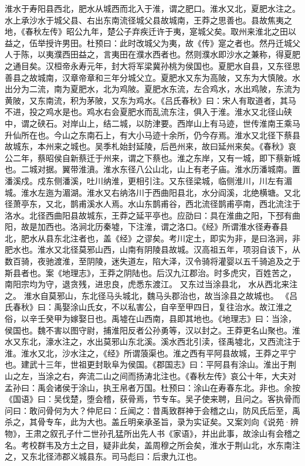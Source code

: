 \documentclass[12pt,UTF8]{ctexbook}
\begin{document}
淮水于寿阳县西北，肥水从城西而北入于淮，谓之肥口。淮水又北，夏肥水注之。水上承沙水于城父县、右出东南流径城父县故城南，王莽之思善也。县故焦夷之地，《春秋左传》昭公九年，楚公子弃疾迁许于夷，寔城父矣。取州来淮北之田以益之，伍举授许男田。杜预曰：此时改城父为夷，故《传》寔之者也。然丹迁城父人于陈，以夷濮西田益之，言夷田在濮水西者也。然则濮水即沙水之兼称，得夏肥之通目矣。汉桓帝永寿元年，封大将军梁冀孙桃为侯国也。夏肥水自县，又东径思善县之故城南，汉章帝章和三年分城父立。夏肥水又东为高陂，又东为大慎陂。水出分为二流，南为夏肥水，北为鸡陂。夏肥水东流，左合鸡水，水出鸡陂，东流为黄陂，又东南流，积为茅陂，又东为鸡水。《吕氏春秋》曰：宋人有取道者，其马不进，投之鸡水是也。鸡水右会夏肥水而乱流东注，俱入于淮。淮水又北径山硖中，谓之硖石。对岸山上，结二城，以防津要。西岸山上有马迹，世传淮南王乘马升仙所在也。今山之东南石上，有大小马迹十余所，仍今存焉。淮水又北径下蔡县故城东，本州来之城也。吴季札始封延陵，后邑州来，故曰延州来矣。《春秋》哀公二年，蔡昭侯自新蔡迁于州来，谓之下蔡也。淮之东岸，又有一城，即下蔡新城也。二城对据。翼带淮濆。淮水东径八公山北，山上有老子庙。淮水历潘城南。置潘溪戍。戍东侧潘溪，吐川纳淮，更相引注。又东径梁城，临侧淮川，川左有湄城。淮水左迤为湄湖。淮水又右纳洛川于西曲阳县北，水分阎溪，北绝横塘。又北径萧亭东，又北，鹊甫溪水人焉。水山东鹊甫谷，西北流径鹊甫亭南，西北流注于洛水。北径西曲阳县故城东，王莽之延平亭也。应劭曰：具在淮曲之阳，下邳有曲阳，故是加西也。洛涧北历秦墟，下注淮，谓之洛口。《经》所谓淮水径寿春县北，肥水从县东北注者也，盖《经》之谬矣。考川定土，即实为非，是曰洛涧，非肥水也。淮水又北径莫邪山西，山南有阴陵县故城。汉高祖五年，项羽自该下，从数百骑，夜驰渡淮，至阴陵，迷失道左，陷大泽，汉令骑将灌婴以五千骑追及之于斯县者也。案《地理志》，王莽之阴陆也。后汉九江郡治。时多虎灾，百姓苦之，南阳宗均为守，退贪残，进忠良，虎悉东渡江。
又东过当涂县北， 水从西北来注之。
淮水自莫邪山，东北径马头城北，魏马头郡治也，故当涂县之故城也。
《吕氏春秋》曰：禹娶涂山氏女，不以私害公，自辛至甲四日，复往治水。故江淮之俗，以辛壬癸甲为嫁娶日也。禹墟在山西南，县即其地也。《地理志》曰：当涂，侯国也。魏不害以图守尉，捕淮阳反者公孙勇等，汉以封之。王莽更名山聚也。淮水又东北，濠水注之，水出莫邪山东北溪。溪水西北引渎，径禹墟北，又西流注于淮。淮水又北，沙水注之，《经》所谓蒗渠也。淮之西有平阿县故城，王莽之平宁也。建武十三年，世祖更封耿阜为侯国。《郡国志》曰：平阿县有涂山。淮出于荆山之左，当涂之右，奔流二山之间而扬涛北注也。《春秋左传》哀公十年，大夫对孟孙曰：禹会诸侯于涂山，执王帛者万国。杜预曰：涂山在寿春东北。非也。余按《国语》曰：吴伐楚，堕会稽，获骨焉，节专车。吴子使来聘，且问之。客执骨而问曰：敢问骨何为大？仲尼曰：丘闻之：昔禹致群神于会稽之山，防风氏后至，禹杀之，其骨专车，此为大也。盖丘明亲承圣旨，录为实证矣。又案刘向《说苑·辨物》，王肃之叙孔子什二世孙孔猛所出先人书《家语》，并出此事，故涂山有会稽之名。考校群韦及方土之目，疑非此矣，盖周穆之所会矣，淮水于荆山北，水东南注之，又东北径沛郡义城县东。司马彪曰：后隶九江也。
\end{document}
